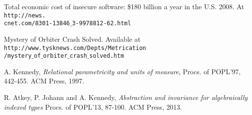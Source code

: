 \documentclass[a4paper,11pt]{article}
\begin{document}
{%





\begin{thebibliography}{}



\vspace*{-0.25in}



\setlength{\parindent}{0pt}

\setlength{\columnsep}{0.3in}

\setlength{\parskip}{-0.1ex}



\begin{multicols}{2}

%
%


Total economic cost of insecure software: \$180 billion a year in the
U.S. 2008. At {\tt http://news.}\\
{\tt cnet.com/8301-13846$\_$3-9978812-62.html}

Mystery of Orbiter Crash Solved. Available at
{\tt http://www.tysknews.com/Depts/Metrication}\\
{\tt /mystery$\_$of$\_$orbiter$\_$crash$\_$solved.htm} 

A. Kennedy,  {\em Relational parametricity and units of measure},
Procs. of POPL'97, 442-455. ACM Press, 1997.


R. Atkey, P. Johann and A. Kennedy, 
{\em 
Abstraction and invariance for algebraically indexed types}
Procs. of POPL'13, 87-100. ACM Press, 2013.



\end{multicols}

\end{thebibliography}



}
\end{document}

